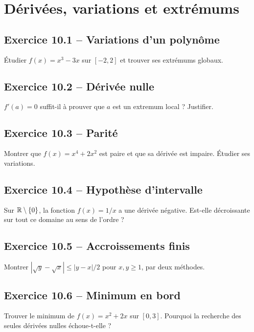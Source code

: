 \chapter{Dérivées, variations et extrémums}
\section*{Exercice 10.1 -- Variations d'un polynôme}
Étudier $f(x)=x^3-3x$ sur $[-2,2]$ et trouver ses extrémums globaux.

\section*{Exercice 10.2 -- Dérivée nulle}
$f'(a)=0$ suffit-il à prouver que $a$ est un extremum local ? Justifier.

\section*{Exercice 10.3 -- Parité}
Montrer que $f(x)=x^4+2x^2$ est paire et que sa dérivée est impaire. Étudier ses variations.

\section*{Exercice 10.4 -- Hypothèse d'intervalle}
Sur $\mathbb{R}\setminus\{0\}$, la fonction $f(x)=1/x$ a une dérivée négative. Est-elle décroissante sur tout ce domaine au sens de l'ordre ?

\section*{Exercice 10.5 -- Accroissements finis}
Montrer $|\sqrt y-\sqrt x|\le|y-x|/2$ pour $x,y\ge1$, par deux méthodes.

\section*{Exercice 10.6 -- Minimum en bord}
Trouver le minimum de $f(x)=x^2+2x$ sur $[0,3]$. Pourquoi la recherche des seules dérivées nulles échoue-t-elle ?

